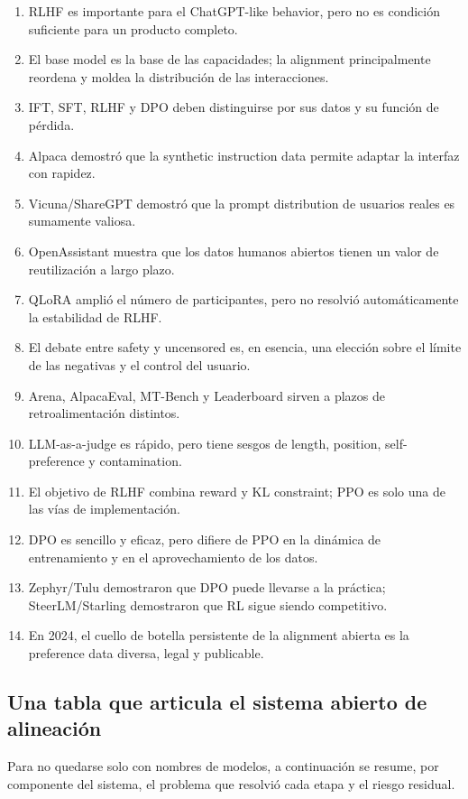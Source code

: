 \begin{enumerate}
  \item RLHF es importante para el ChatGPT-like behavior, pero no es condición suficiente para un producto completo.
  \item El base model es la base de las capacidades; la alignment principalmente reordena y moldea la distribución de las interacciones.
  \item IFT, SFT, RLHF y DPO deben distinguirse por sus datos y su función de pérdida.
  \item Alpaca demostró que la synthetic instruction data permite adaptar la interfaz con rapidez.
  \item Vicuna/ShareGPT demostró que la prompt distribution de usuarios reales es sumamente valiosa.
  \item OpenAssistant muestra que los datos humanos abiertos tienen un valor de reutilización a largo plazo.
  \item QLoRA amplió el número de participantes, pero no resolvió automáticamente la estabilidad de RLHF.
  \item El debate entre safety y uncensored es, en esencia, una elección sobre el límite de las negativas y el control del usuario.
  \item Arena, AlpacaEval, MT-Bench y Leaderboard sirven a plazos de retroalimentación distintos.
  \item LLM-as-a-judge es rápido, pero tiene sesgos de length, position, self-preference y contamination.
  \item El objetivo de RLHF combina reward y KL constraint; PPO es solo una de las vías de implementación.
  \item DPO es sencillo y eficaz, pero difiere de PPO en la dinámica de entrenamiento y en el aprovechamiento de los datos.
  \item Zephyr/Tulu demostraron que DPO puede llevarse a la práctica; SteerLM/Starling demostraron que RL sigue siendo competitivo.
  \item En 2024, el cuello de botella persistente de la alignment abierta es la preference data diversa, legal y publicable.
\end{enumerate}

\subsection{Una tabla que articula el sistema abierto de alineación}

Para no quedarse solo con nombres de modelos, a continuación se resume, por componente del sistema, el problema que resolvió cada etapa y el riesgo residual.

